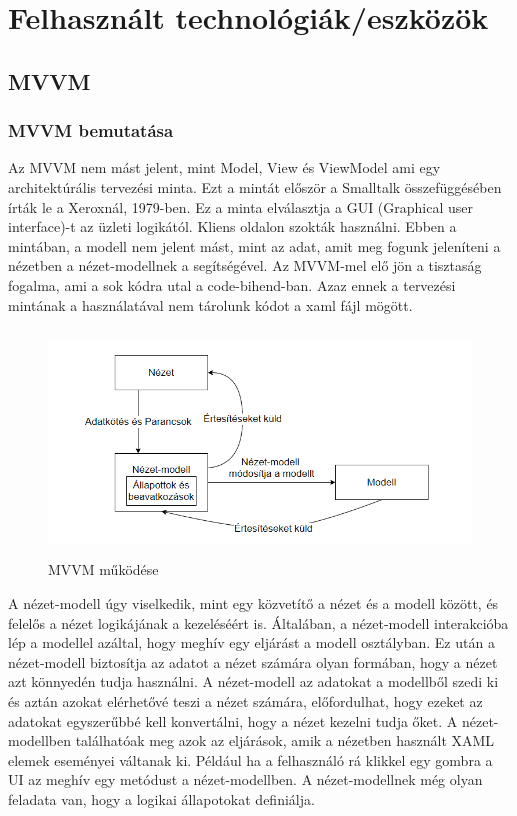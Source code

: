 \documentclass[
]{thesis-ekf}
\theoremstyle{definition}
\theoremstyle{remark}
\begin{document}
\chapter{Felhasznált technológiák/eszközök}
\section{MVVM}
\subsection{MVVM bemutatása}

Az MVVM nem mást jelent, mint Model, View és ViewModel ami egy architektúrális tervezési minta. Ezt a mintát először a Smalltalk összefüggésében írták le a Xeroxnál, 1979-ben.\cite{mvvmbook} Ez a minta elválasztja a GUI (Graphical user interface)-t az üzleti logikától. Kliens oldalon szokták használni. Ebben a mintában, a modell nem jelent mást, mint az adat, amit meg fogunk jeleníteni a nézetben a nézet-modellnek a segítségével. Az MVVM-mel elő jön a tisztaság fogalma, ami a sok kódra utal a code-bihend-ban. Azaz ennek a tervezési mintának a használatával nem tárolunk kódot a xaml fájl mögött. 
\begin{figure}[ht!]
	\centering
	\includegraphics[height=6cm]{mvvmdiag}
	\caption[MVVM]{MVVM működése \cite{mvvmmicrosoft}}
	\label{fig:mvvmdiag}
\end{figure}
A nézet-modell úgy viselkedik, mint egy közvetítő a nézet és a modell között, és felelős a nézet logikájának a kezeléséért is. Általában, a nézet-modell interakcióba lép a modellel azáltal, hogy meghív egy eljárást a modell osztályban. Ez után a nézet-modell biztosítja az adatot a nézet számára olyan formában, hogy a nézet azt könnyedén tudja használni. A nézet-modell az adatokat a modellből szedi ki és aztán azokat elérhetővé teszi a nézet számára, előfordulhat, hogy ezeket az adatokat egyszerűbbé kell konvertálni, hogy a nézet kezelni tudja őket. A nézet-modellben találhatóak meg azok az eljárások, amik a nézetben használt XAML elemek eseményei váltanak ki. Például ha a felhasználó rá klikkel egy gombra a UI az meghív egy metódust a nézet-modellben. A nézet-modellnek még olyan feladata van, hogy a logikai állapotokat definiálja.\cite{mvvmmicrosoft}
\end{document}
